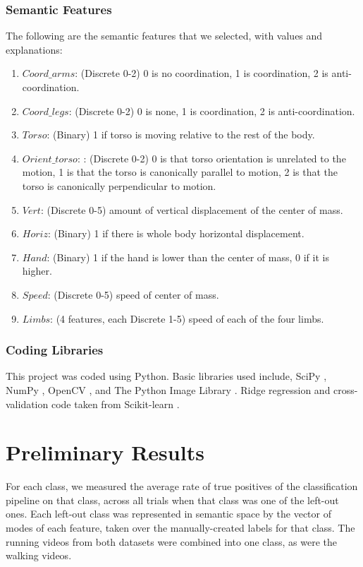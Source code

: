 \documentclass{article}
\begin{document}
\subsubsection{Semantic Features}
\label{sf}
The following are the semantic features that we selected, with values and explanations:
\begin{enumerate}
\item
$Coord\_arms$: (Discrete 0-2) 0 is no coordination, 1 is coordination, 2 is anti-coordination.
\item
$Coord\_legs$: (Discrete 0-2) 0 is none, 1 is coordination, 2 is anti-coordination.
\item
$Torso$: (Binary) 1 if torso is moving relative to the rest of the body.
\item
$Orient\_torso$: : (Discrete 0-2) 0 is that torso orientation is unrelated to the motion, 1 is that the torso is canonically parallel to motion, 2 is that the torso is canonically perpendicular to motion.
\item
$Vert$: (Discrete 0-5) amount of vertical displacement of the center of mass.
\item
$Horiz$: (Binary) 1 if there is whole body horizontal displacement.
\item
$Hand$: (Binary) 1 if the hand is lower than the center of mass, 0 if it is higher.
\item
$Speed$: (Discrete 0-5) speed of center of mass.
\item
$Limbs$: (4 features, each Discrete 1-5) speed of each of the four limbs.
\end{enumerate}
\subsubsection{Coding Libraries}
This project was coded using Python. Basic libraries used include, SciPy \cite{scipy}, NumPy \cite{numpy}, OpenCV \cite{opencv}, and The Python Image Library \cite{pil}. Ridge regression and cross-validation code taken from Scikit-learn \cite{scikit}.

\section{Preliminary Results} %
For each class, we measured the average rate of true positives of the classification pipeline on that class, across all trials when that class was one of the left-out ones. Each left-out class was represented in semantic space by the vector of modes of each feature, taken over the manually-created labels for that class. The running videos from both datasets were combined into one class, as were the walking videos.
\end{document}
